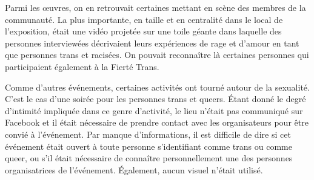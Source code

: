 Parmi les œuvres, on en retrouvait certaines mettant en scène des membres de la communauté.
La plus importante, en taille et en centralité dans le local de l'exposition, était une vidéo projetée sur une toile géante dans laquelle des personnes interviewées décrivaient leurs expériences de rage et d'amour en tant que personnes trans et racisées.
On pouvait reconnaître là certaines personnes qui participaient également à la Fierté Trans.

Comme d'autres événements, certaines activités ont tourné autour de la sexualité.
C'est le cas d'une soirée \bdsm{} pour les personnes trans et queers.
Étant donné le degré d'intimité impliquée dans ce genre d'activité, le lieu n'était pas communiqué sur Facebook et il était nécessaire de prendre contact avec les organisateurs pour être convié à l'événement.
Par manque d'informations, il est difficile de dire si cet événement était ouvert à toute personne s'identifiant comme trans ou comme queer, ou s’il était nécessaire de connaître personnellement une des personnes organisatrices de l'événement.
Également, aucun visuel n'était utilisé.

